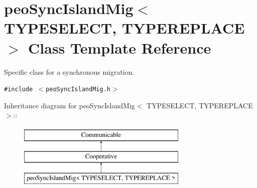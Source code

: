 \hypertarget{classpeoSyncIslandMig}{
\section{peo\-Sync\-Island\-Mig$<$ TYPESELECT, TYPEREPLACE $>$ Class Template Reference}
\label{classpeoSyncIslandMig}
}
Specific class for a synchronous migration.  


{\tt \#include $<$peo\-Sync\-Island\-Mig.h$>$}

Inheritance diagram for peo\-Sync\-Island\-Mig$<$ TYPESELECT, TYPEREPLACE $>$::\begin{figure}[H]
\begin{center}
\leavevmode
\includegraphics[height=3cm]{classpeoSyncIslandMig}
\end{center}
\end{figure}
